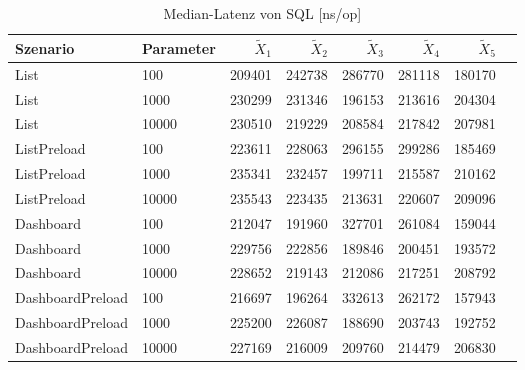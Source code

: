 
\begin{table}[ht]
\setlength{\extrarowheight}{-1pt}
\centering
\caption{Median-Latenz von SQL [ns/op]}
\begin{tabular}{llrrrrrr}
\toprule
Szenario & Parameter & ${\tilde{X}_1}$ & ${\tilde{X}_2}$ & ${\tilde{X}_3}$ & ${\tilde{X}_4}$ & ${\tilde{X}_5}$ \\
\midrule
	List & 100 & 209401 & 242738 & 286770 & 281118 & 180170 \\
	List & 1000 & 230299 & 231346 & 196153 & 213616 & 204304 \\
	List & 10000 & 230510 & 219229 & 208584 & 217842 & 207981 \\
	ListPreload & 100 & 223611 & 228063 & 296155 & 299286 & 185469 \\
	ListPreload & 1000 & 235341 & 232457 & 199711 & 215587 & 210162 \\
	ListPreload & 10000 & 235543 & 223435 & 213631 & 220607 & 209096 \\
	Dashboard & 100 & 212047 & 191960 & 327701 & 261084 & 159044 \\
	Dashboard & 1000 & 229756 & 222856 & 189846 & 200451 & 193572 \\
	Dashboard & 10000 & 228652 & 219143 & 212086 & 217251 & 208792 \\
	DashboardPreload & 100 & 216697 & 196264 & 332613 & 262172 & 157943 \\
	DashboardPreload & 1000 & 225200 & 226087 & 188690 & 203743 & 192752 \\
	DashboardPreload & 10000 & 227169 & 216009 & 209760 & 214479 & 206830 \\
\bottomrule
\end{tabular}
\label{tab:durchsatz_sql}
\end{table}
	